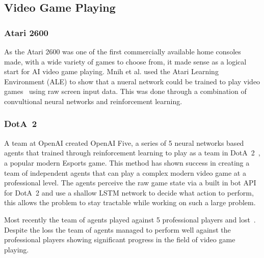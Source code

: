 \subsection{Video Game Playing}
\subsubsection{Atari 2600} \label{sssec:Atari2600}
As the Atari 2600 was one of the first commercially available home consoles made, with a wide variety of games to choose from, it made sense as a logical start for AI video game playing.
Mnih et al. used the Atari Learning Environment (ALE) to show that a nueral network could be trained to play video games~\cite{DeepAtari} using raw screen input data.
This was done through a combination of convultional neural networks and reinforcement learning.
\subsubsection{DotA~2}
A team at OpenAI created OpenAI Five, a series of 5 neural networks based agents that trained through reinforcement learning to play as a team in DotA~2~\cite{OpenAIFive}, a popular modern Esports game.
This method has shown success in creating a team of independent agents that can play a complex modern video game at a professional level.
The agents perceive the raw game state via a built in bot API for DotA~2 and use a shallow LSTM network to decide what action to perform, this allows the problem to stay tractable while working on such a large problem.
\par
Most recently the team of agents played against 5 professional players and lost~\cite{OpenAIInternational}.
Despite the loss the team of agents managed to perform well against the professional players showing significant progress in the field of video game playing.

